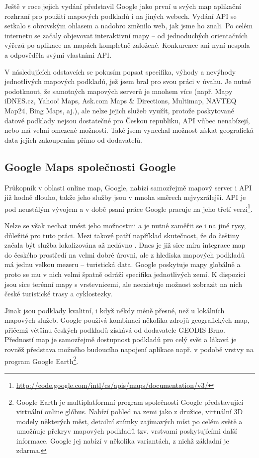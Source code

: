 Ještě v roce jejich vydání představil Google jako první u svých
map aplikační rozhraní pro použití mapových podkladů i na jiných
webech. Vydání API se setkalo s obrovským ohlasem \cite{gmapsSuccess}
a nadobro změnilo web, jak jsme ho znali. Po celém internetu se začaly objevovat
interaktivní mapy -- od jednoduchých orientačních výřezů po aplikace
na mapách kompletně založené. Konkurence ani nyní nespala a odpověděla
svými vlastními API.

V následujících odstavcích se pokusím popsat specifika, výhody a
nevýhody jednotlivých mapových podkladů, jež jsem bral pro svou práci
v úvahu. Je nutné podotknout, že samotných mapových serverů je mnohem
více (např. Mapy iDNES.cz, Yahoo! Maps, Ask.com Maps \& Directions,
Multimap, NAVTEQ Map24, Bing Maps, aj.), ale nelze jejich služeb využít,
protože poskytované datové podklady nejsou dostatečné pro Českou
republiku, API vůbec nenabízejí, nebo má velmi omezené možnosti. Také
jsem vynechal možnost získat geografická data jejich zakoupením přímo od dodavatelů.

\subsection{Google Maps společnosti Google}
Průkopník v oblasti online map, Google, nabízí samozřejmě mapový
server i API již hodně dlouho, takže jeho služby jsou v mnoha směrech
nejvyzrálejší. API je pod neustálým vývojem a v době psaní práce
Google pracuje na jeho třetí
verzi\footnote{\url{http://code.google.com/intl/cs/apis/maps/documentation/v3/}}.

Nelze se však nechat unést jeho možnostmi a je nutné zaměřit se i na
jiné rysy, důležité pro tuto práci. Mezi takové patří
například skutečnost, že do češtiny začala být služba lokalizována až
nedávno \cite{googleCesky}.
Dnes je již sice míra integrace map do českého prostředí na velmi
dobré úrovni, ale z hlediska mapových podkladů má jednu velkou mezeru
-- turistická data. Google poskytuje mapy globálně a proto se mu v
nich velmi špatně odráží specifika jednotlivých zemí. K dispozici
jsou sice terénní mapy s vrstevnicemi, ale neexistuje možnost
zobrazit na nich české turistické trasy a cyklostezky.

Jinak jsou podklady kvalitní, i když někdy méně přesné, než u
lokálních mapových služeb. Google používá kombinaci několika zdrojů
geografických map, přičemž většinu českých podkladů získává od
dodavatele GEODIS Brno. Předností map je samozřejmě dostupnost
podkladů pro celý svět a lákavá je rovněž představa možného budoucího 
napojení aplikace např. v podobě vrstvy na program Google
Earth\footnote{Google Earth je multiplatformní program společnosti
Google představující virtuální online glóbus. Nabízí pohled na zemi
jako z družice, virtuální 3D modely některých měst, detailní snímky
zajímavých míst po celém světě a umožňuje překryv mapových podkladů
tzv. vrstvami poskytujícími další informace. Google jej nabízí v
několika variantách, z nichž základní je zdarma.}.

